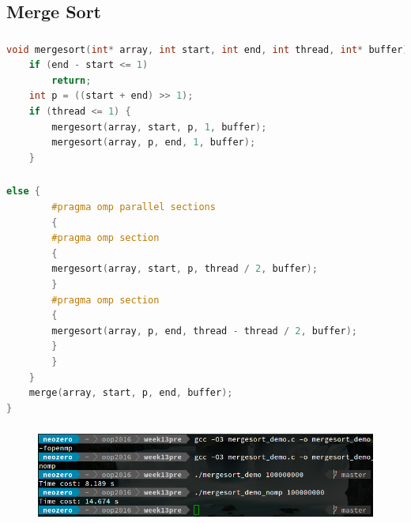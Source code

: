 \documentclass{beamer}
\begin{document}
	\subsection{Merge Sort}
	\begin{frame}[fragile]
		\frametitle{\insertsubsection}
		\begin{lstlisting}[language=C++,numbers=none]
void mergesort(int* array, int start, int end, int thread, int* buffer) {
    if (end - start <= 1)
        return;
    int p = ((start + end) >> 1);
    if (thread <= 1) {
        mergesort(array, start, p, 1, buffer);
        mergesort(array, p, end, 1, buffer);
    }\end{lstlisting}
\end{frame}
	\begin{frame}[fragile]
		\frametitle{\insertsubsection}
		\begin{lstlisting}[language=C++,numbers=none]
    else {
        #pragma omp parallel sections
        {
        #pragma omp section
        {
        mergesort(array, start, p, thread / 2, buffer);
        }
        #pragma omp section
        {
        mergesort(array, p, end, thread - thread / 2, buffer);
        }
        }
    }
    merge(array, start, p, end, buffer);
}\end{lstlisting}
\end{frame}

\begin{frame}
	\frametitle{\insertsubsection}
	\begin{figure}[H]
		\centering
		\includegraphics[width=\linewidth]{mergesort.png}
		\end{figure}
\end{frame}
\end{document}

